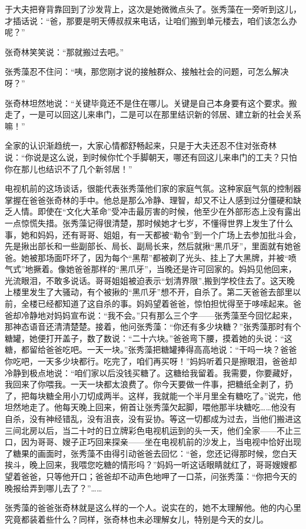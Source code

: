 \par 于大夫把脊背靠回到了沙发背上，这次是她微微点头了。张秀藻在一旁听到这儿，才插话说：“爸，那要是明天傅叔叔来电话，让咱们搬到单元楼去，咱们该怎么办呢？”
\par 张奇林笑笑说：“那就搬过去吧。”
\par 张秀藻忍不住问：“咦，那您刚才说的接触群众、接触社会的问题，可怎么解决呀？”
\par 张奇林坦然地说：“关键毕竟还不是住在哪儿。关键是自己本身要有这个要求。搬走了，一是可以回这儿来串门，二是可以在那里结识新的邻居、建立新的社会关系嘛！”
\par 全家的认识渐趋统一，大家心情都舒畅起来，只是于大夫还忍不住对张奇林说：“你说是这么说，到时候你忙个手脚朝天，哪还有回这儿来串门的工夫？只怕你在那儿也结识不了几个新邻居！”
\par 电视机前的这场谈话，很能代表张秀藻他们家的家庭气氛。这种家庭气氛的控制器掌握在爸爸张奇林的手中。他总是那么冷静、理智，却又不让人感到过分僵硬和缺乏人情。即使在“文化大革命”受冲击最厉害的时候，他至少在外部形态上没有露出一点惊慌失措。张秀藻记得很清楚，那时候她才七岁，不懂得世界上发生了什么事，她和妈妈，还有哥哥、姐姐，有一天都被“勒令”到一个广场上去参加批斗会，先是揪出部长和一些副部长、局长、副局长来，然后就揪“黑爪牙”，里面就有她爸爸。她被那场面吓坏了，因为每个“黑帮”都被剃了光头、挂上了大黑牌，并被“喷气式”地撅着。像她爸爸那样的“黑爪牙”，当晚还是许可回家的。妈妈见他回来，光流眼泪，不敢多说话。哥哥姐姐被迫表示“划清界限”,搬到学校住去了。这天晚上楼里发生了大骚动，有个被揪的“黑爪牙”想不开，自杀了。第二天爸爸去部里以前，全楼已经都知道了这自杀的事。妈妈望着爸爸，惊怕担忧得至于哆嗦起来。爸爸却冷静地对妈妈宣布说：“我不会。”只有那么三个字——张秀藻至今回忆起来，那神态语音还清清楚楚。接着，他问张秀藻：“你还有多少块糖？”张秀藻那时有个糖罐，她便打开盖子，数了数说：“二十六块。”爸爸弯下腰，摸着她的头说：“这糖，都留给爸爸吃吧。一天一块。”张秀藻把糖罐捧得高高地说：“干吗一块？爸爸你吃吧，一天多少块都行。吃完了，咱们再买呀！”妈妈听着只是擦眼泪，爸爸却冷静到极点地说：“咱们家以后没钱买糖了。这糖给我留着。我需要，你要藏好，我回来了你喂我。一天一块都太浪费了。你今天要做一件事，把糖纸全剥了，扔了，把每块糖全用小刀切成两半。这样，我就能一个半月里全有糖吃了。”说完，他坦然地走了。他每天晚上回来，俯首让张秀藻欠起脚，喂他那半块糖吃……他没有自杀，没有神经错乱，没有沮丧，没有妥协。等这一切都成为过去，当他们搬进这三间北房以后，当二十吋的日立牌彩色电视机运到的头一天，他们全家——不止三口，因为哥哥、嫂子正巧回来探亲——坐在电视机前的沙发上，当电视中恰好出现了糖果的画面时，张秀藻不由得引动爸爸去回忆：“爸，您还记得那时候，您白天挨斗，晚上回来，我喂您吃糖的情形吗？”妈妈一听这话眼睛就红了，哥哥嫂嫂都望着爸爸，只等他开口；爸爸却不动声色地呷了一口茶，问张秀藻：“你把今天的晚报给弄到哪儿去了？”……
\par 张秀藻的爸爸张奇林就是这么样的一个人。说实在的，她不太理解他。他的内心里究竟都装着些什么？同样，张奇林也未必理解女儿，特别是今天的女儿。


